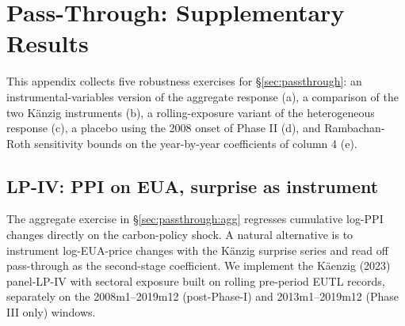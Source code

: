 %
%

\section{Pass-Through: Supplementary Results}\label{app:passthrough}

This appendix collects five robustness exercises for §\ref{sec:passthrough}: an instrumental-variables version of the aggregate response (a), a comparison of the two Känzig instruments (b), a rolling-exposure variant of the heterogeneous response (c), a placebo using the 2008 onset of Phase II (d), and Rambachan-Roth sensitivity bounds on the year-by-year coefficients of column 4 (e).

\subsection{LP-IV: PPI on EUA, surprise as instrument}\label{app:passthrough:iv}

The aggregate exercise in §\ref{sec:passthrough:agg} regresses cumulative log-PPI changes directly on the carbon-policy shock. A natural alternative is to instrument log-EUA-price changes with the Känzig surprise series and read off pass-through as the second-stage coefficient. We implement the Käenzig (2023) panel-LP-IV with sectoral exposure built on rolling pre-period EUTL records, separately on the 2008m1--2019m12 (post-Phase-I) and 2013m1--2019m12 (Phase III only) windows.

